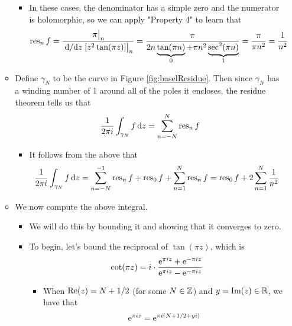 \documentclass[../notes.tex]{subfiles}
\begin{document}
\begin{itemize}
\begin{itemize}
        \begin{itemize}
            \item In these cases, the denominator has a simple zero and the numerator is holomorphic, so we can apply "Property 4" to learn that
            \begin{equation*}
                \res_nf = \frac{\eval{\pi}_n}{\eval{\dv*{z}[z^2\tan(\pi z)]}_n}
                = \frac{\pi}{2n\underbrace{\tan(\pi n)}_0+\pi n^2\underbrace{\sec^2(\pi n)}_1}
                = \frac{\pi}{\pi n^2}
                = \frac{1}{n^2}
            \end{equation*}
        \end{itemize}
        \item Define $\gamma_N$ to be the curve in Figure \ref{fig:baselResidue}. Then since $\gamma_N$ has a winding number of 1 around all of the poles it encloses, the residue theorem tells us that
        \begin{equation*}
            \frac{1}{2\pi i}\int_{\gamma_N}f\dd{z} = \sum_{n=-N}^N\res_nf
        \end{equation*}
        \begin{itemize}
            \item It follows from the above that
            \begin{equation*}
                \frac{1}{2\pi i}\int_{\gamma_N}f\dd{z} = \sum_{n=-N}^{-1}\res_nf+\res_0f+\sum_{n=1}^N\res_nf
                = \res_0f+2\sum_{n=1}^N\frac{1}{n^2}
            \end{equation*}
        \end{itemize}
        \item We now compute the above integral.
        \begin{itemize}
            \item We will do this by bounding it and showing that it converges to zero.
            \item To begin, let's bound the reciprocal of $\tan(\pi z)$, which is
            \begin{equation*}
                \cot(\pi z) = i\cdot\frac{\e[\pi iz]+\e[-\pi iz]}{\e[\pi iz]-\e[-\pi iz]}
            \end{equation*}
            \begin{itemize}
                \item When $\re(z)=N+1/2$ (for some $N\in\Z$) and $y=\im(z)\in\R$, we have that
                \begin{equation*}
                    \e[\pi iz] = \e[\pi i(N+1/2+yi)]

\end{equation*}
\end{itemize}
\end{itemize}
\end{itemize}
\end{itemize}
\end{document}
